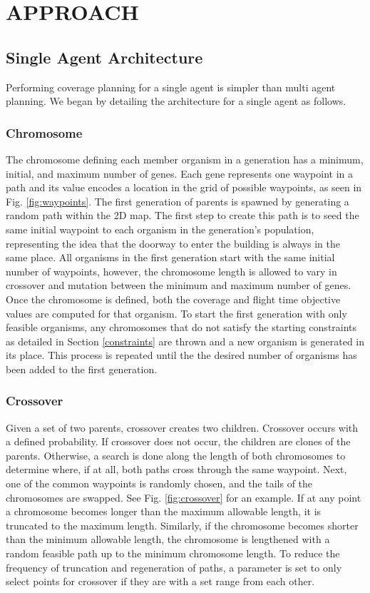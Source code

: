 \documentclass[letterpaper, 10 pt, conference]{ieeeconf}  %
\begin{document}
\section{APPROACH}\label{approach}
\subsection{Single Agent Architecture}

Performing coverage planning for a single agent is simpler than multi agent planning. We began by detailing the architecture for a single agent as follows.

\subsubsection{Chromosome}

The chromosome defining each member organism in a generation has a minimum, initial, and maximum number of genes. Each gene represents one waypoint in a path and its value encodes a location in the grid of possible waypoints, as seen in Fig. \ref{fig:waypoints}. The first generation of parents is spawned by generating a random path within the 2D map. The first step to create this path is to seed the same initial waypoint to each organism in the generation's population, representing the idea that the doorway to enter the building is always in the same place. All organisms in the first generation start with the same initial number of waypoints, however, the chromosome length is allowed to vary in crossover and mutation between the minimum and maximum number of genes. Once the chromosome is defined, both the coverage and flight time objective values are computed for that organism. To start the first generation with only feasible organisms, any chromosomes that do not satisfy the starting constraints as detailed in Section \ref{constraints} are thrown and a new organism is generated in its place. This process is repeated until the the desired number of organisms has been added to the first generation.

\subsubsection{Crossover}

Given a set of two parents, crossover creates two children. Crossover occurs with a defined probability. If crossover does not occur, the children are clones of the parents. Otherwise, a search is done along the length of both chromosomes to determine where, if at all, both paths cross through the same waypoint. Next, one of the common waypoints is randomly chosen, and the tails of the chromosomes are swapped. See Fig. \ref{fig:crossover} for an example. If at any point a chromosome becomes longer than the maximum allowable length, it is truncated to the maximum length. Similarly, if the chromosome becomes shorter than the minimum allowable length, the chromosome is lengthened with a random feasible path up to the minimum chromosome length. To reduce the frequency of truncation and regeneration of paths, a parameter is set to only select points for crossover if they are with a set range from each other.
\end{document}
